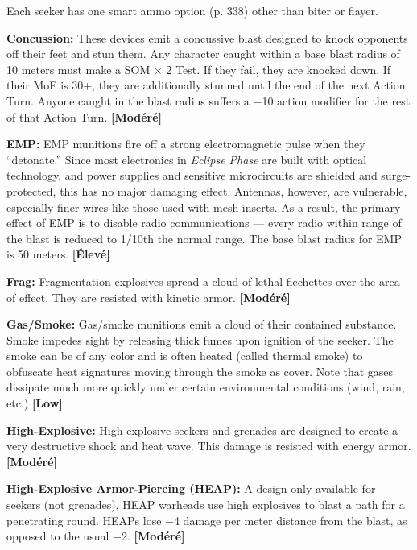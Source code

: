 {{Each seeker has one smart ammo option (p. 338) other than biter or flayer. 

\textbf{Concussion:} These devices emit a concussive blast designed to knock opponents off their feet and stun them. Any character caught within a base blast radius of 10 meters must make a SOM $\times$ 2 Test. If they fail, they are knocked down. If their MoF is 30+, they are additionally stunned until the end of the next Action Turn. Anyone caught in the blast radius suffers a $-$10 action modifier for the rest of that Action Turn. \textbf{[Modéré]} 

\textbf{EMP:} EMP munitions fire off a strong electromagnetic pulse when they ``detonate.'' Since most electronics in \emph{Eclipse Phase} are built with optical technology, and power supplies and sensitive microcircuits are shielded and surge-protected, this has no major damaging effect. Antennas, however, are vulnerable, especially finer wires like those used with mesh inserts. As a result, the primary effect of EMP is to disable radio communications --- every radio within range of the blast is reduced to 1/10th the normal range. The base blast radius for EMP is 50 meters. \textbf{[Élevé]} 

\textbf{Frag:} Fragmentation explosives spread a cloud of lethal flechettes over the area of effect. They are resisted with kinetic armor. \textbf{[Modéré]} 

\textbf{Gas/Smoke:} Gas/smoke munitions emit a cloud of their contained substance. Smoke impedes sight by releasing thick fumes upon ignition of the seeker. The smoke can be of any color and is often heated (called thermal smoke) to obfuscate heat signatures moving through the smoke as cover. Note that gases dissipate much more quickly under certain environmental conditions (wind, rain, etc.) \textbf{[Low]} 

\textbf{High-Explosive:} High-explosive seekers and grenades are designed to create a very destructive shock and heat wave. This damage is resisted with energy armor. \textbf{[Modéré]} 

\textbf{High-Explosive Armor-Piercing (HEAP):} A design only available for seekers (not grenades), HEAP warheads use high explosives to blast a path for a penetrating round. HEAPs lose $-$4 damage per meter distance from the blast, as opposed to the usual $-$2. \textbf{[Modéré]} 

}}
